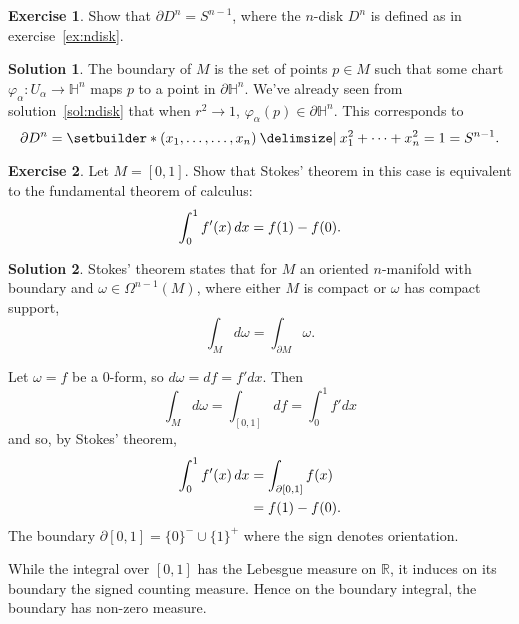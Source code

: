 \documentclass[11pt, a4paper]{report}
\theoremstyle{definition}
\newtheorem{exercise}{Exercise}[part]
\newtheorem{solution}{Solution}[part]
\newenvironment{ex}{\begin{exercise}}{\end{exercise}\pagebreak[1]}
\newenvironment{sol}{\begin{solution}}{\end{solution}\pagebreak[3]}
\newenvironment{nowidthtags}{\usetagform{nowidth}}{\ignorespacesafterend}
\newcommand*{\op}[1]{\ensuremath\mathop{}\mathopen{}#1}
\renewcommand*{\d}{\op{d}}
\begin{document}
\begin{ex}

Show that $\partial D^n = S^{n - 1}$, where the $n$-disk $D^n$ is defined as in exercise~\ref{ex:ndisk}.

\end{ex}

\begin{sol}

The boundary of $M$ is the set of points $p \in M$ such that some chart $\varphi_\alpha: U_\alpha \to \mathbb{H}^n$ maps $p$ to a point in $\partial\mathbb{H}^n$.
We've already seen from solution~\ref{sol:ndisk} that when $r^2 \to 1$, $\varphi_\alpha(p) \in \partial\mathbb{H}^n$. This corresponds to
\[
    \partial D^n = \setbuilder*{(x_1, \ldots, \ldots, x_n) \given x_1^2 + \cdots + x_n^2 = 1} = S^{n - 1}.
\]

\end{sol}

\begin{ex}

Let $M = [0, 1]$. Show that Stokes' theorem in this case is equivalent to the fundamental theorem of calculus:
\[
    \int_0^1 f'(x) \d x = f(1) - f(0).
\]

\end{ex}

\begin{sol}

Stokes' theorem states that for $M$ an oriented $n$-manifold with boundary and $\omega \in \Omega^{n - 1}(M)$, where either $M$ is compact or $\omega$ has compact support,
\begin{nowidthtags}
\[
    \int_M d\omega = \int_{\partial M} \omega. \tag{Stokes' theorem}\label{eq:stokestheorem}
\]
\end{nowidthtags}

Let $\omega = f$ be a 0-form, so $d\omega = df = f' dx$. Then
\[
    \int_M d\omega = \int_{[0, 1]} df = \int_0^1 f' dx
\]
and so, by Stokes' theorem,
\begin{align*}
\int_0^1 f'(x) \d x &= \int_{\partial [0, 1]} f(x) \\
                    &= f(1) - f(0).
\end{align*}
The boundary $\partial [0, 1] = {\{0\}}^-\! \cup {\{1\}}^+$ where the sign denotes orientation.

While the integral over $[0, 1]$ has the Lebesgue measure on $\mathbb{R}$, it induces on its boundary the signed counting measure. Hence on the boundary integral, the boundary has non-zero measure.

\end{sol}
\end{document}
